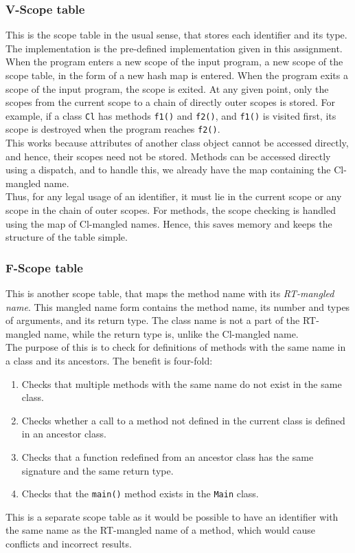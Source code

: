 \documentclass{article}
\begin{document}
\subsubsection*{V-Scope table}
This is the scope table in the usual sense, that stores each identifier and its type. The implementation is the pre-defined implementation given in this assignment. When the program enters a new scope of the input program, a new scope of the scope table, in the form of a new hash map is entered. When the program exits a scope of the input program, the scope is exited. At any given point, only the scopes from the current scope to a chain of directly outer scopes is stored. For example, if a class \verb|Cl| has methods \verb|f1()| and \verb|f2()|, and \verb|f1()| is visited first, its scope is destroyed when the program reaches \verb|f2()|.
\\
This works because attributes of another class object cannot be accessed directly, and hence, their scopes need not be stored. Methods can be accessed directly using a dispatch, and to handle this, we already have the map containing the Cl-mangled name.
\\
Thus, for any legal usage of an identifier, it must lie in the current scope or any scope in the chain of outer scopes. For methods, the scope checking is handled using the map of Cl-mangled names. Hence, this saves memory and keeps the structure of the table simple.

\subsubsection*{F-Scope table}
This is another scope table, that maps the method name with its \textit{RT-mangled name}. This mangled name form contains the method name, its number and types of arguments, and its return type. The class name is not a part of the RT-mangled name, while the return type is, unlike the Cl-mangled name.
\\
The purpose of this is to check for definitions of methods with the same name in a class and its ancestors. The benefit is four-fold:
\begin{enumerate}
	\item Checks that multiple methods with the same name do not exist in the same class.
	\item Checks whether a call to a method not defined in the current class is defined in an ancestor class.
	\item Checks that a function redefined from an ancestor class has the same signature and the same return type.
	\item Checks that the \verb|main()| method exists in the \verb|Main| class.
\end{enumerate}
This is a separate scope table as it would be possible to have an identifier with the same name as the RT-mangled name of a method, which would cause conflicts and incorrect results.
\end{document}
